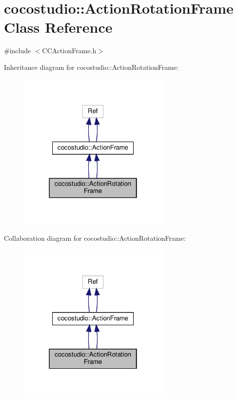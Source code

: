 \hypertarget{classcocostudio_1_1ActionRotationFrame}{}\section{cocostudio\+:\+:Action\+Rotation\+Frame Class Reference}
\label{classcocostudio_1_1ActionRotationFrame}


{\ttfamily \#include $<$C\+C\+Action\+Frame.\+h$>$}



Inheritance diagram for cocostudio\+:\+:Action\+Rotation\+Frame\+:
\nopagebreak
\begin{figure}[H]
\begin{center}
\leavevmode
\includegraphics[width=214pt]{classcocostudio_1_1ActionRotationFrame__inherit__graph}
\end{center}
\end{figure}


Collaboration diagram for cocostudio\+:\+:Action\+Rotation\+Frame\+:
\nopagebreak
\begin{figure}[H]
\begin{center}
\leavevmode
\includegraphics[width=214pt]{classcocostudio_1_1ActionRotationFrame__coll__graph}
\end{center}
\end{figure}
